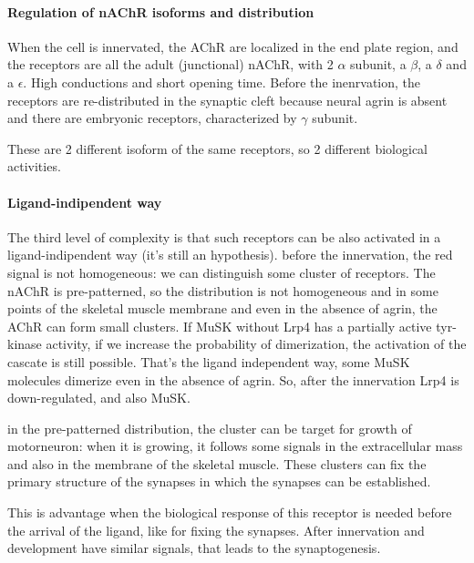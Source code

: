 \documentclass[a4paper, 12pt]{book}
\begin{document}
\paragraph{Regulation of nAChR isoforms and distribution}
When the cell is innervated, the AChR are localized in the end plate region, and the receptors are all the adult (junctional) nAChR, with 2 $\alpha$ subunit, a $\beta$, a $\delta$ and a $\epsilon$. High conductions and short opening time. Before the inenrvation, the receptors are re-distributed in the synaptic cleft because neural agrin is absent and there are embryonic receptors, characterized by $\gamma$ subunit.

These are 2 different isoform of the same receptors, so 2 different biological activities.

\paragraph{Ligand-indipendent way} The third level of complexity is that such receptors can be also activated in a ligand-indipendent way (it's still an hypothesis). before the innervation, the red signal is not homogeneous: we can distinguish some cluster of receptors. The nAChR is pre-patterned, so the distribution is not homogeneous and in some points of the skeletal muscle membrane and even in the absence of agrin, the AChR can form small clusters. If MuSK without Lrp4 has a partially active tyr-kinase activity, if we increase the probability of dimerization, the activation of the cascate is still possible. That's the ligand independent way, some MuSK molecules dimerize even in the absence of agrin. So, after the innervation Lrp4 is down-regulated, and also MuSK.

in the pre-patterned distribution, the cluster can be target for growth of motorneuron: when it is growing, it follows some signals in the extracellular mass and also in the membrane of the skeletal muscle. These clusters can fix the primary structure of the synapses in which the synapses can be established.

This is advantage when the biological response of this receptor is needed before the arrival of the ligand, like for fixing the synapses. After innervation and development have similar signals, that leads to the synaptogenesis.
\end{document}
